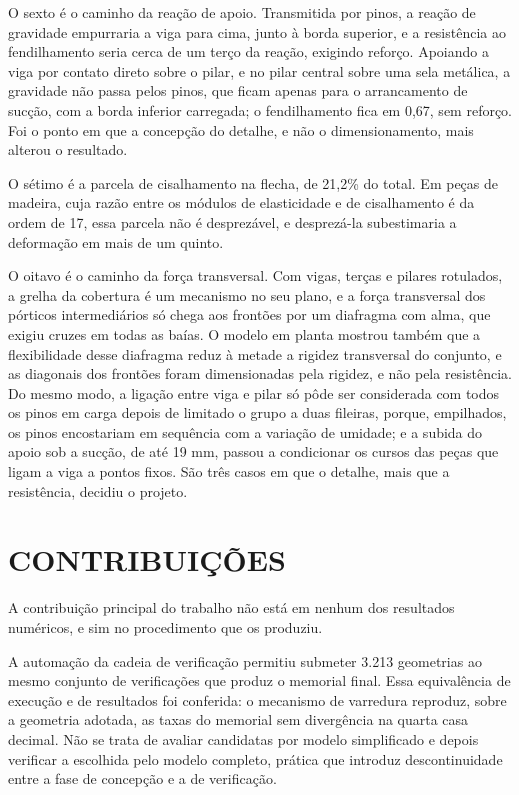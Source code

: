 O sexto é o caminho da reação de apoio. Transmitida por pinos, a reação de
gravidade empurraria a viga para cima, junto à borda superior, e a resistência
ao fendilhamento seria cerca de um terço da reação, exigindo reforço. Apoiando a
viga por contato direto sobre o pilar, e no pilar central sobre uma sela
metálica, a gravidade não passa pelos pinos, que ficam apenas para o
arrancamento de sucção, com a borda inferior carregada; o fendilhamento fica em
0,67, sem reforço. Foi o ponto em que a concepção do detalhe, e não o
dimensionamento, mais alterou o resultado.

O sétimo é a parcela de cisalhamento na flecha, de 21,2\% do total. Em peças de
madeira, cuja razão entre os módulos de elasticidade e de cisalhamento é da
ordem de 17, essa parcela não é desprezável, e desprezá-la subestimaria a
deformação em mais de um quinto.

O oitavo é o caminho da força transversal. Com vigas, terças e pilares
rotulados, a grelha da cobertura é um mecanismo no seu plano, e a força
transversal dos pórticos intermediários só chega aos frontões por um diafragma
com alma, que exigiu cruzes em todas as baías. O modelo em planta mostrou também
que a flexibilidade desse diafragma reduz à metade a rigidez transversal do
conjunto, e as diagonais dos frontões foram dimensionadas pela rigidez, e não
pela resistência. Do mesmo modo, a ligação entre viga e pilar só pôde ser
considerada com todos os pinos em carga depois de limitado o grupo a duas
fileiras, porque, empilhados, os pinos encostariam em sequência com a variação
de umidade; e a subida do apoio sob a sucção, de até 19 mm, passou a condicionar
os cursos das peças que ligam a viga a pontos fixos. São três casos em que o
detalhe, mais que a resistência, decidiu o projeto.

\section{CONTRIBUIÇÕES}\label{sec:contribuicoes}

A contribuição principal do trabalho não está em nenhum dos resultados
numéricos, e sim no procedimento que os produziu.

A automação da cadeia de verificação permitiu submeter 3.213 geometrias ao mesmo
conjunto de \nVerifExt{} verificações que produz o memorial final. Essa equivalência
de execução e de resultados foi conferida: o mecanismo de varredura reproduz, sobre a geometria adotada, as
taxas do memorial sem divergência na quarta casa decimal. Não se trata de
avaliar candidatas por modelo simplificado e depois verificar a escolhida pelo
modelo completo, prática que introduz descontinuidade entre a fase de concepção
e a de verificação.


